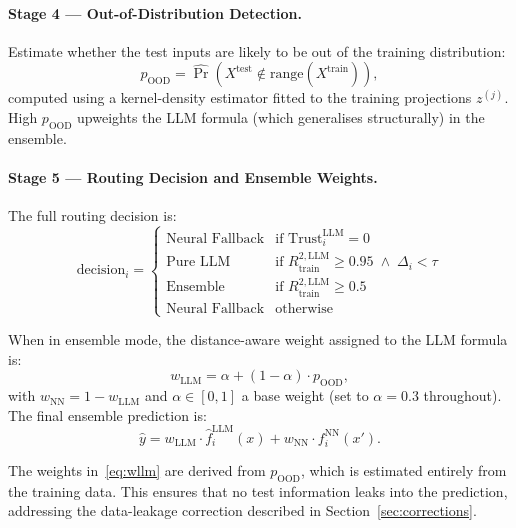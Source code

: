 \documentclass[twoside,11pt]{article}
\newcommand{\wLLM}{w_{\mathrm{LLM}}}
\newcommand{\wNN}{w_{\mathrm{NN}}}
\begin{document}
\paragraph{Stage 4 --- Out-of-Distribution Detection.}
Estimate whether the test inputs are likely to be out of the training distribution:
\begin{equation}
  p_{\mathrm{OOD}} = \hat{\Pr}\!\left(X^{\mathrm{test}} \notin \mathrm{range}(X^{\mathrm{train}})\right),
  \label{eq:ood}
\end{equation}
computed using a kernel-density estimator fitted to the training projections $z^{(j)}$.
High $p_{\mathrm{OOD}}$ upweights the LLM formula (which generalises structurally) in
the ensemble.

\paragraph{Stage 5 --- Routing Decision and Ensemble Weights.}
The full routing decision is:
\begin{equation}
  \mathrm{decision}_i = \begin{cases}
    \text{Neural Fallback} & \text{if Trust}_i^{\mathrm{LLM}} = 0 \\
    \text{Pure LLM}        & \text{if } {R^{2,\mathrm{LLM}}_{\mathrm{train}}} \ge 0.95 \;\land\; \Delta_i < \tau \\
    \text{Ensemble}        & \text{if } {R^{2,\mathrm{LLM}}_{\mathrm{train}}} \ge 0.5 \\
    \text{Neural Fallback} & \text{otherwise}
  \end{cases}
  \label{eq:routing}
\end{equation}

When in ensemble mode, the distance-aware weight assigned to the LLM formula is:
\begin{equation}
  \wLLM = \alpha + (1 - \alpha)\cdot p_{\mathrm{OOD}},
  \label{eq:wllm}
\end{equation}
with $\wNN = 1 - \wLLM$ and $\alpha \in [0,1]$ a base weight (set to $\alpha=0.3$
throughout).  The final ensemble prediction is:
\begin{equation}
  \hat{y} = \wLLM \cdot \hat{f}^{\mathrm{LLM}}_i(x) + \wNN \cdot f^{\mathrm{NN}}_i(x').
  \label{eq:ensemble}
\end{equation}

\begin{remark}
The weights in~\eqref{eq:wllm} are derived from $p_{\mathrm{OOD}}$, which is
estimated entirely from the training data.  This ensures that no test information
leaks into the prediction, addressing the data-leakage correction described in
Section~\ref{sec:corrections}.
\end{remark}
\end{document}
